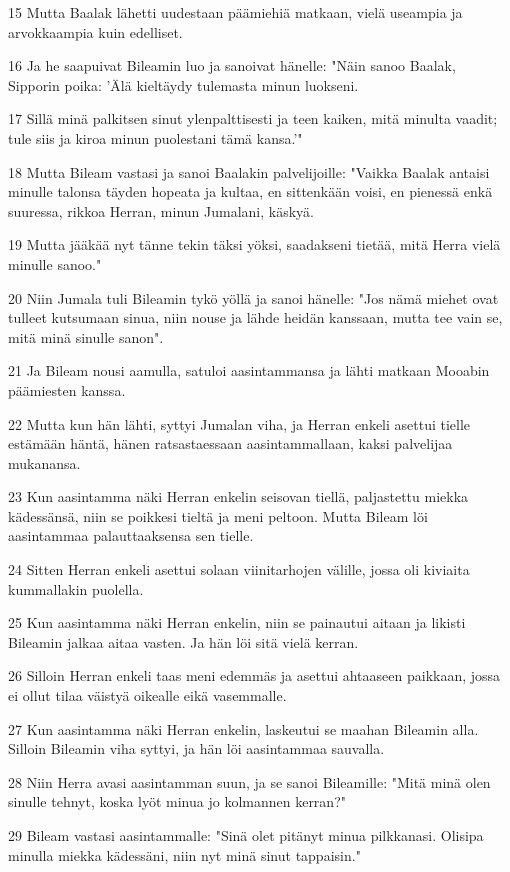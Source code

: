 \par 15 Mutta Baalak lähetti uudestaan päämiehiä matkaan, vielä useampia ja arvokkaampia kuin edelliset.
\par 16 Ja he saapuivat Bileamin luo ja sanoivat hänelle: "Näin sanoo Baalak, Sipporin poika: 'Älä kieltäydy tulemasta minun luokseni.
\par 17 Sillä minä palkitsen sinut ylenpalttisesti ja teen kaiken, mitä minulta vaadit; tule siis ja kiroa minun puolestani tämä kansa.'"
\par 18 Mutta Bileam vastasi ja sanoi Baalakin palvelijoille: "Vaikka Baalak antaisi minulle talonsa täyden hopeata ja kultaa, en sittenkään voisi, en pienessä enkä suuressa, rikkoa Herran, minun Jumalani, käskyä.
\par 19 Mutta jääkää nyt tänne tekin täksi yöksi, saadakseni tietää, mitä Herra vielä minulle sanoo."
\par 20 Niin Jumala tuli Bileamin tykö yöllä ja sanoi hänelle: "Jos nämä miehet ovat tulleet kutsumaan sinua, niin nouse ja lähde heidän kanssaan, mutta tee vain se, mitä minä sinulle sanon".
\par 21 Ja Bileam nousi aamulla, satuloi aasintammansa ja lähti matkaan Mooabin päämiesten kanssa.
\par 22 Mutta kun hän lähti, syttyi Jumalan viha, ja Herran enkeli asettui tielle estämään häntä, hänen ratsastaessaan aasintammallaan, kaksi palvelijaa mukanansa.
\par 23 Kun aasintamma näki Herran enkelin seisovan tiellä, paljastettu miekka kädessänsä, niin se poikkesi tieltä ja meni peltoon. Mutta Bileam löi aasintammaa palauttaaksensa sen tielle.
\par 24 Sitten Herran enkeli asettui solaan viinitarhojen välille, jossa oli kiviaita kummallakin puolella.
\par 25 Kun aasintamma näki Herran enkelin, niin se painautui aitaan ja likisti Bileamin jalkaa aitaa vasten. Ja hän löi sitä vielä kerran.
\par 26 Silloin Herran enkeli taas meni edemmäs ja asettui ahtaaseen paikkaan, jossa ei ollut tilaa väistyä oikealle eikä vasemmalle.
\par 27 Kun aasintamma näki Herran enkelin, laskeutui se maahan Bileamin alla. Silloin Bileamin viha syttyi, ja hän löi aasintammaa sauvalla.
\par 28 Niin Herra avasi aasintamman suun, ja se sanoi Bileamille: "Mitä minä olen sinulle tehnyt, koska lyöt minua jo kolmannen kerran?"
\par 29 Bileam vastasi aasintammalle: "Sinä olet pitänyt minua pilkkanasi. Olisipa minulla miekka kädessäni, niin nyt minä sinut tappaisin."
